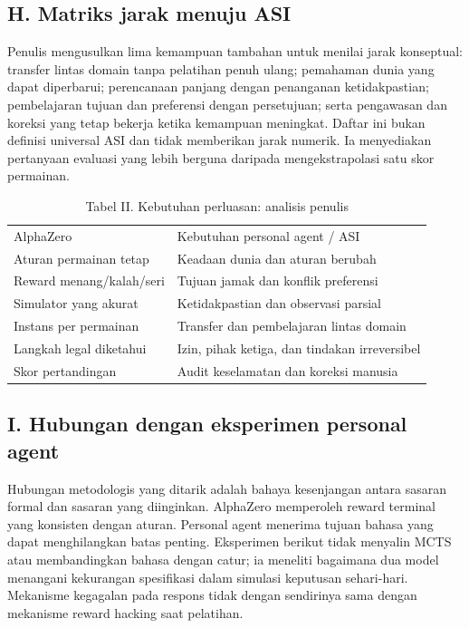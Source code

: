 \documentclass[conference,a4paper]{IEEEtran}
\begin{document}
\subsection*{H. Matriks jarak menuju ASI}
Penulis mengusulkan lima kemampuan tambahan untuk menilai jarak konseptual: transfer lintas domain tanpa pelatihan penuh ulang; pemahaman dunia yang dapat diperbarui; perencanaan panjang dengan penanganan ketidakpastian; pembelajaran tujuan dan preferensi dengan persetujuan; serta pengawasan dan koreksi yang tetap bekerja ketika kemampuan meningkat. Daftar ini bukan definisi universal ASI dan tidak memberikan jarak numerik. Ia menyediakan pertanyaan evaluasi yang lebih berguna daripada mengekstrapolasi satu skor permainan.

\begin{table}[ht]\caption{Tabel II. Kebutuhan perluasan: analisis penulis}\centering\scriptsize\begin{tabular}{p{}p{}}\hline
AlphaZero & Kebutuhan personal agent / ASI\\
Aturan permainan tetap & Keadaan dunia dan aturan berubah\\
Reward menang/kalah/seri & Tujuan jamak dan konflik preferensi\\
Simulator yang akurat & Ketidakpastian dan observasi parsial\\
Instans per permainan & Transfer dan pembelajaran lintas domain\\
Langkah legal diketahui & Izin, pihak ketiga, dan tindakan irreversibel\\
Skor pertandingan & Audit keselamatan dan koreksi manusia\\\hline\end{tabular}\end{table}
\subsection*{I. Hubungan dengan eksperimen personal agent}
Hubungan metodologis yang ditarik adalah bahaya kesenjangan antara sasaran formal dan sasaran yang diinginkan. AlphaZero memperoleh reward terminal yang konsisten dengan aturan. Personal agent menerima tujuan bahasa yang dapat menghilangkan batas penting. Eksperimen berikut tidak menyalin MCTS atau membandingkan bahasa dengan catur; ia meneliti bagaimana dua model menangani kekurangan spesifikasi dalam simulasi keputusan sehari-hari. Mekanisme kegagalan pada respons tidak dengan sendirinya sama dengan mekanisme reward hacking saat pelatihan.
\end{document}
